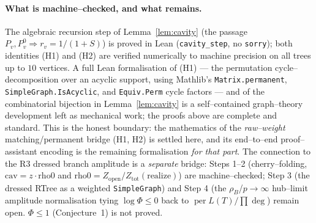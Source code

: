 \documentclass[11pt]{article}
\newcommand{\per}{\operatorname{per}}
\begin{document}
\paragraph{What is machine--checked, and what remains.}
The algebraic recursion step of Lemma~\ref{lem:cavity} (the passage $P_v,P_v^0\Rightarrow r_v=1/(1+S)$) is
proved in Lean (\texttt{cavity\_step}, no \texttt{sorry}); both identities (H1) and (H2) are verified
numerically to machine precision on all trees up to $10$ vertices. A full Lean formalisation of (H1) --- the
permutation cycle--decomposition over an acyclic support, using Mathlib's \texttt{Matrix.permanent},
\texttt{SimpleGraph.IsAcyclic}, and \texttt{Equiv.Perm} cycle factors --- and of the combinatorial bijection
in Lemma~\ref{lem:cavity} is a self--contained graph--theory development left as mechanical work; the proofs
above are complete and standard. This is the honest boundary: the mathematics of the \emph{raw--weight}
matching/permanent bridge (H1, H2) is settled here, and its end--to--end proof--assistant encoding is the
remaining formalisation \emph{for that part}. The connection to the R3 dressed branch amplitude is a
\emph{separate} bridge: Steps 1--2 (cherry--folding, $\mathrm{cav}=z\cdot\mathrm{rho0}$ and
$\mathrm{rho0}=Z_{\mathrm{open}}/Z_{\mathrm{tot}}(\mathrm{realize})$) are machine--checked; Step 3 (the dressed
RTree as a weighted \texttt{SimpleGraph}) and Step 4 (the $\rho_B$/$p\to\infty$ hub--limit amplitude
normalisation tying $\log\Phi\le0$ back to $\per L(T)/\prod\deg$) remain open. $\Phi\le1$ (Conjecture~1) is not
proved.
\end{document}
